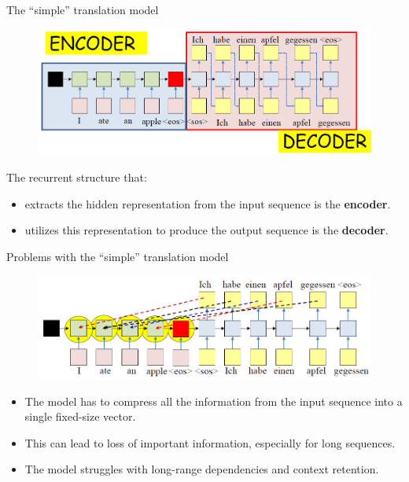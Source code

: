\begin{frame}{The “simple” translation model}
    \begin{figure}
        \centering
        \includegraphics[width=\linewidth, height=0.7\textheight,keepaspectratio]{images/nlp/simple-transition-model.png}
    \end{figure}

    The recurrent structure that:
    \begin{itemize}
        \item extracts the hidden representation from the input sequence is the \textbf{encoder}.
        \item utilizes this representation to produce the output sequence is the \textbf{decoder}.
    \end{itemize}
\end{frame}

\begin{frame}{Problems with the “simple” translation model}
    \begin{figure}
        \centering
        \includegraphics[width=\linewidth, height=0.7\textheight,keepaspectratio]{images/nlp/problem-simple-transition.png}
    \end{figure}
    \begin{itemize}
        \item The model has to compress all the information from the input sequence into a single fixed-size vector.
        \item This can lead to loss of important information, especially for long sequences.
        \item The model struggles with long-range dependencies and context retention.
    \end{itemize}
\end{frame}

